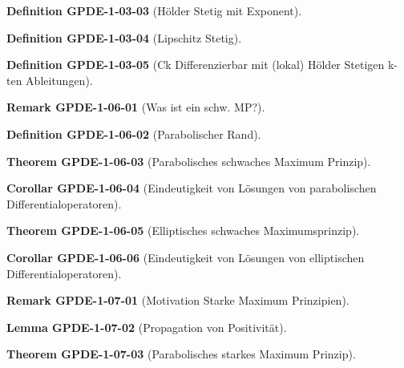 \documentclass[10pt, letterpaper]{article}
\newcommand{\CustomHeading}[3]{%
  \par\medskip\noindent%
  \textbf{#1 #2} \textnormal{(#3)}.\enskip%
}
\newenvironment{DEF}[2]{\CustomHeading{Definition}{#1}{#2}}{}
\newenvironment{THEO}[2]{\CustomHeading{Theorem}{#1}{#2}}{}
\newenvironment{LEM}[2]{\CustomHeading{Lemma}{#1}{#2}}{}
\newenvironment{KORO}[2]{\CustomHeading{Corollar}{#1}{#2}}{}
\newenvironment{REM}[2]{\CustomHeading{Remark}{#1}{#2}}{}
\begin{document}
\begin{DEF}{GPDE-1-03-03}{Hölder Stetig mit Exponent}
\end{DEF}

\begin{DEF}{GPDE-1-03-04}{Lipschitz Stetig}
\end{DEF}

\begin{DEF}{GPDE-1-03-05}{Ck Differenzierbar mit (lokal) Hölder Stetigen k-ten Ableitungen}
\end{DEF}

\begin{REM}{GPDE-1-06-01}{Was ist ein schw. MP?}
\end{REM}

\begin{DEF}{GPDE-1-06-02}{Parabolischer Rand}
\end{DEF}

\begin{THEO}{GPDE-1-06-03}{Parabolisches schwaches Maximum Prinzip}
\end{THEO}

\begin{KORO}{GPDE-1-06-04}{Eindeutigkeit von Lösungen von parabolischen Differentialoperatoren}
\end{KORO}

\begin{THEO}{GPDE-1-06-05}{Elliptisches schwaches Maximumsprinzip}
\end{THEO}

\begin{KORO}{GPDE-1-06-06}{Eindeutigkeit von Lösungen von elliptischen Differentialoperatoren}
\end{KORO}

\begin{REM}{GPDE-1-07-01}{Motivation Starke Maximum Prinzipien}
\end{REM}

\begin{LEM}{GPDE-1-07-02}{Propagation von Positivität}
\end{LEM}

\begin{THEO}{GPDE-1-07-03}{Parabolisches starkes Maximum Prinzip}
\end{THEO}
\end{document}

